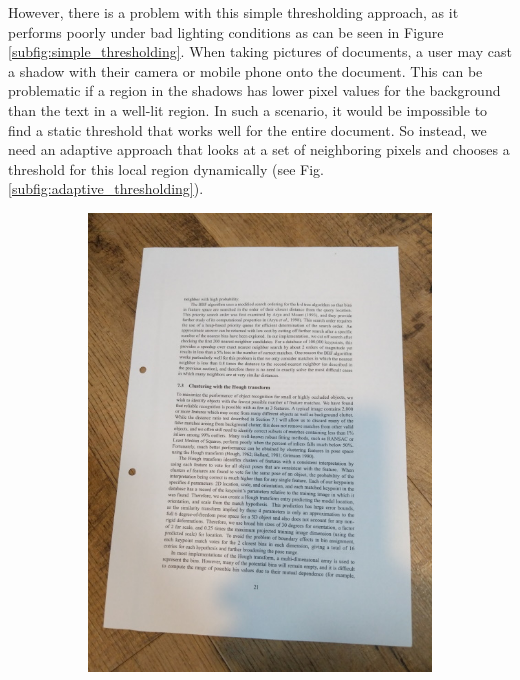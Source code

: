 \documentclass[bibliography=totoc]{scrartcl}
\begin{document}
However, there is a problem with this simple thresholding approach, as it performs poorly under bad lighting conditions as can be seen in Figure \ref{subfig:simple_thresholding}.
When taking pictures of documents, a user may cast a shadow with their camera or mobile phone onto the document.
This can be problematic if a region in the shadows has lower pixel values for the background than the text in a well-lit region.
In such a scenario, it would be impossible to find a static threshold that works well for the entire document.
So instead, we need an adaptive approach that looks at a set of neighboring pixels and chooses a threshold for this local region dynamically (see Fig. \ref{subfig:adaptive_thresholding}). \\

\begin{figure}[ht!]
	\centering
	\begin{subfigure}[t]{0.3\linewidth}
		\includegraphics[width=\linewidth]{imgs/test/bad_lighting.jpg}

\end{subfigure}
\end{figure}
\end{document}
